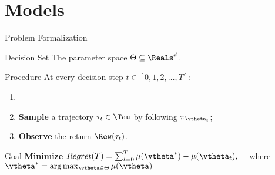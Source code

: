 \section{Models}

\begin{frame}{Problem Formalization}

\onslide<+->\begin{block}{Decision Set}
The parameter space $\Theta\subseteq\Reals^d$.
\end{block}

\onslide<+->\begin{block}{Procedure}
At every decision step $t\in[0,1,2,\dots,T]$:
	\begin{enumerate}
			\item<+-|alert@+> 
			\item<+-|alert@+> \textbf{Sample} a trajectory $\tau_t\in\Tau$ by following $\pi_{\vtheta_t}$;
			\item<+-|alert@+> \textbf{Observe} the return $\Rew(\tau_t)$.
		\end{enumerate}
\end{block}


\onslide<+->\begin{block}{Goal}
\textbf{Minimize} $Regret(T) = \sum_{t=0}^{T}\mu(\vtheta^*)-\mu(\vtheta_t), \quad$ where $\vtheta^*=\arg\max_{\vtheta\in\Theta}\mu(\vtheta)$
\end{block}




\end{frame}

